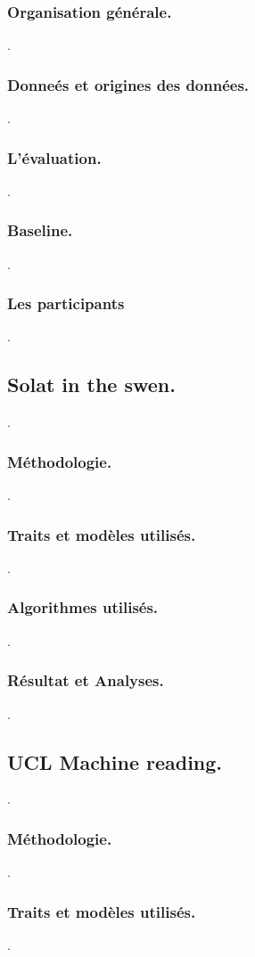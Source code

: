 \documentclass[onecolumn, 12pt]{article}
\begin{document}
    \subsubsection{Organisation générale.}
.
    \subsubsection{Donneés et origines des données.}
.
    \subsubsection{L'évaluation.}
.
    \subsubsection{Baseline.}
.
    \subsubsection{Les participants}
.
  \subsection{Solat in the swen.}
.
    \subsubsection{Méthodologie.}
.
    \subsubsection{Traits et modèles utilisés.}
.
    \subsubsection{Algorithmes utilisés.}
.
    \subsubsection{Résultat et Analyses.}
.
  \subsection{UCL Machine reading.}
.
    \subsubsection{Méthodologie.}
.
    \subsubsection{Traits et modèles utilisés.}
.
\end{document}
